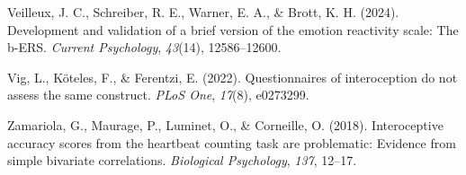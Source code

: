 \documentclass[
  jou,
  floatsintext,
  longtable,
  nolmodern,
  notxfonts,
  notimes,
  colorlinks=true,linkcolor=blue,citecolor=blue,urlcolor=blue]{apa7}
\newlength{\cslhangindent}
\newenvironment{CSLReferences}[2] %
 {\begin{list}{}{%
  \setlength{\itemindent}{0pt}
  \setlength{\leftmargin}{0pt}
  \setlength{\parsep}{0pt}
  \ifodd #1
   \setlength{\leftmargin}{\cslhangindent}
   \setlength{\itemindent}{-1\cslhangindent}
  \fi
  \setlength{\itemsep}{#2\baselineskip}}}
 {\end{list}}
\begin{document}
\begin{CSLReferences}{1}{0}
Veilleux, J. C., Schreiber, R. E., Warner, E. A., \& Brott, K. H.
(2024). Development and validation of a brief version of the emotion
reactivity scale: The b-ERS. \emph{Current Psychology}, \emph{43}(14),
12586--12600.

Vig, L., Köteles, F., \& Ferentzi, E. (2022). Questionnaires of
interoception do not assess the same construct. \emph{PLoS One},
\emph{17}(8), e0273299.

Zamariola, G., Maurage, P., Luminet, O., \& Corneille, O. (2018).
Interoceptive accuracy scores from the heartbeat counting task are
problematic: Evidence from simple bivariate correlations.
\emph{Biological Psychology}, \emph{137}, 12--17.

\end{CSLReferences}
\end{document}

